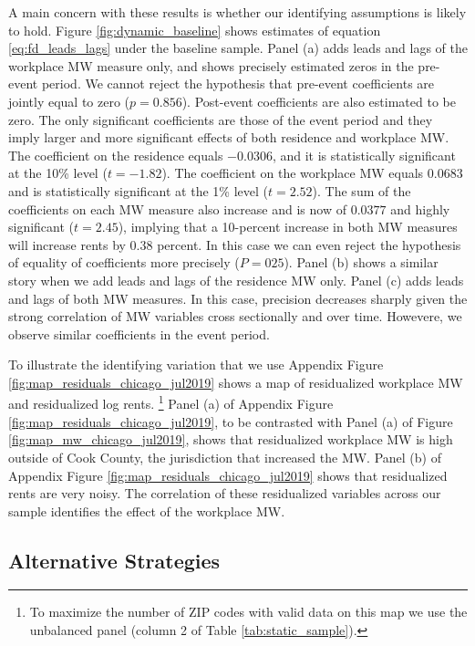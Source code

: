 A main concern with these results is whether our identifying assumptions is 
likely to hold.
Figure \ref{fig:dynamic_baseline} shows estimates of equation 
\eqref{eq:fd_leads_lags} under the baseline sample.
Panel (a) adds leads and lags of the workplace MW measure only, and shows
precisely estimated zeros in the pre-event period.
We cannot reject the hypothesis that pre-event coefficients are jointly equal
to zero ($p = 0.856$).
Post-event coefficients are also estimated to be zero.
The only significant coefficients are those of the event period and they imply 
larger and more significant effects of both residence and workplace MW.
The coefficient on the residence equals $-0.0306$, and it is 
statistically significant at the 10\% level ($t=-1.82$).
The coefficient on the workplace MW equals $0.0683$ and is 
statistically significant at the 1\% level ($t=2.52$).
The sum of the coefficients on each MW measure also increase and is now of
$0.0377$ and highly significant ($t=2.45$), implying that a 10-percent increase 
in both MW measures will increase rents by $0.38$ percent.
In this case we can even reject the hypothesis of equality of coefficients more
precisely ($P = 025$).
Panel (b) shows a similar story when we add leads and lags of the residence MW
only.
Panel (c) adds leads and lags of both MW measures.
In this case, precision decreases sharply given the strong correlation of 
MW variables cross sectionally and over time. Howevere, we observe similar 
coefficients in the event period.

To illustrate the identifying variation that we use 
Appendix Figure \ref{fig:map_residuals_chicago_jul2019} shows a map of 
residualized workplace MW and residualized log rents.%
\footnote{To maximize the number of ZIP codes with valid data on this map we
use the unbalanced panel (column 2 of Table \ref{tab:static_sample}).}
Panel (a) of Appendix Figure \ref{fig:map_residuals_chicago_jul2019}, to be 
contrasted with Panel (a) of Figure \ref{fig:map_mw_chicago_jul2019}, 
shows that residualized workplace MW is high outside of Cook County, the 
jurisdiction that increased the MW.
Panel (b) of Appendix Figure \ref{fig:map_residuals_chicago_jul2019} shows that 
residualized rents are very noisy.
The correlation of these residualized variables across our sample identifies
the effect of the workplace MW.

\subsection{Alternative Strategies}

